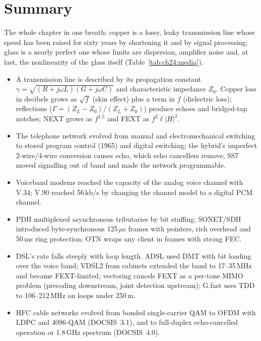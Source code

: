 \section{Summary}
\label{sec:ch24:summary}



The whole chapter in one breath: copper is a lossy, leaky transmission line whose speed has been
raised for sixty years by shortening it and by signal processing; glass is a nearly perfect one whose
limits are dispersion, amplifier noise and, at last, the nonlinearity of the glass itself
(Table~\ref{tab:ch24:media}).

\begin{itemize}
\item A transmission line is described by its propagation constant $\gamma=\sqrt{(R+j\omega L)(G+j\omega C)}$
and characteristic impedance $Z_0$. Copper loss in decibels grows as $\sqrt f$ (skin effect) plus a term in
$f$ (dielectric loss); reflections ($\Gamma=(Z_L-Z_0)/(Z_L+Z_0)$) produce echoes and bridged-tap notches;
NEXT grows as $f^{1.5}$ and FEXT as $f^2\ell|H|^2$.
\item The telephone network evolved from manual and electromechanical switching to stored program control
(1965) and digital switching; the hybrid's imperfect 2-wire/4-wire conversion causes echo, which echo
cancellers remove; SS7 moved signalling out of band and made the network programmable.
\item Voiceband modems reached the capacity of the analog voice channel with V.34; V.90 reached 56\,kb/s
by changing the channel model to a digital PCM channel.
\item PDH multiplexed asynchronous tributaries by bit stuffing; SONET/SDH introduced byte-synchronous
125\,$\mu$s frames with pointers, rich overhead and 50\,ms ring protection; OTN wraps any client in frames
with strong FEC.
\item DSL's rate falls steeply with loop length. ADSL used DMT with bit loading over the voice band; VDSL2
from cabinets extended the band to 17--35\,MHz and became FEXT-limited; vectoring cancels FEXT as a
per-tone MIMO problem (precoding downstream, joint detection upstream); G.fast uses TDD to 106--212\,MHz on
loops under 250\,m.
\item HFC cable networks evolved from bonded single-carrier QAM to OFDM with LDPC and 4096-QAM (DOCSIS~3.1),
and to full-duplex echo-cancelled operation or 1.8\,GHz spectrum (DOCSIS~4.0).

\end{itemize}
